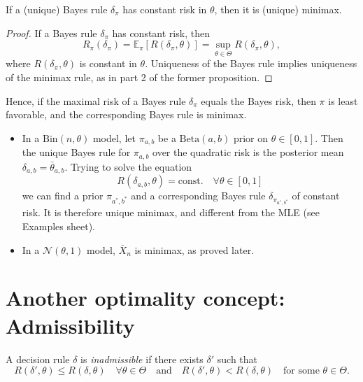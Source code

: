 \documentclass[open=any, 11pt,paper=A4]{scrreprt}
\begin{document}
\begin{corollary}
If a (unique) Bayes rule \(\delta_{\pi}\) has constant risk in \(\theta\), then it is (unique) minimax.
\end{corollary}

\begin{proof}
If a Bayes rule \(\delta_{\pi}\) has constant risk, then
\[
R_{\pi}(\delta_{\pi}) = \mathbb{E}_{\pi}[R(\delta_{\pi}, \theta)] = \sup_{\theta \in \Theta} R(\delta_{\pi}, \theta),
\]
where \(R(\delta_{\pi}, \theta)\) is constant in \(\theta\). Uniqueness of the Bayes rule implies uniqueness of the minimax rule, as in part 2 of the former proposition.
\end{proof}

\begin{example}
Hence, if the maximal risk of a Bayes rule \(\delta_{\pi}\) equals the Bayes risk, then \(\pi\) is least favorable, and the corresponding Bayes rule is minimax.
\begin{itemize}
    \item In a \(\text{Bin}(n, \theta)\) model, let \(\pi_{a,b}\) be a \(\text{Beta}(a, b)\) prior on \(\theta \in [0,1]\). Then the unique Bayes rule for \(\pi_{a,b}\) over the quadratic risk is the posterior mean \(\delta_{a,b} = \bar{\theta}_{a,b}\). Trying to solve the equation
    \[
    R(\delta_{a,b}, \theta) = \text{const.} \quad \forall \theta \in [0,1]
    \]
    we can find a prior \(\pi_{a^*, b^*}\) and a corresponding Bayes rule \(\delta_{\pi_{a^*, b^*}}\) of constant risk. It is therefore unique minimax, and different from the MLE (see Examples sheet).
    
    \item In a \(\mathcal{N}(\theta, 1)\) model, \(\bar{X}_n\) is minimax, as proved later.
\end{itemize}
\end{example}

\section{Another optimality concept: Admissibility}

\begin{definition}
A decision rule \(\delta\) is \emph{inadmissible} if there exists \(\delta'\) such that
\[
R(\delta', \theta) \leq R(\delta, \theta) \quad \forall \theta \in \Theta \quad \text{and} \quad R(\delta', \theta) < R(\delta, \theta) \quad \text{for some } \theta \in \Theta.
\]
\end{definition}
\end{document}
